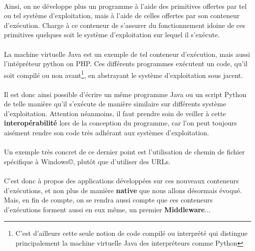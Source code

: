 {  \paragraph{} Ainsi, on ne développe plus un programme à l'aide des primitives offertes par tel ou
  tel système d'exploitation, mais à l'aide de celles offertes par son conteneur d'exécution. Charge à
  ce conteneur de s'assurer du fonctionnement idoine de ces primitives quelques soit le système
  d'exploitation sur lequel il s'exécute.

  \paragraph{} La machine virtuelle Java est un exemple de tel conteneur d'exécution, mais aussi
  l'intépréteur python on PHP. Ces différents programmes exécutent un code, qu'il soit compilé ou non
  avant\footnote{C'est d'ailleurs cette seule notion de code compilé ou interprété qui distingue
  principalement la machine virtuelle Java des interpréteurs comme Python}, en abstrayant le système
  d'exploitation sous jacent.

  \paragraph{} Il est donc ainsi possible d'écrire un même programme Java ou un script Python de telle
  manière qu'il s'exécute de manière similaire sur différents système d'exploitation. Attention
  néanmoins, il faut prendre soin de veiller à cette \textbf{interopérabilité} lors de la conception
  du programme, car l'on peut toujours aisément rendre son code très adhérant aux systèmes
  d'exploitation.

  \paragraph{} Un exemple très concret de ce dernier point est l'utilisation de chemin de fichier
  spécifique à Windows©, plutôt que d'utiliser des URLs.


  \paragraph{} C'est donc à propos des applications développées sur ces nouveaux conteneurs
  d'exécutions, et non plus de manière \textbf{native} que nous allons désormais évoqué. Mais, en fin
  de compte, on se rendra aussi compte que ces conteneurs d'exécutions forment aussi en eux même, un
  premier \textbf{Middleware}...

  }

